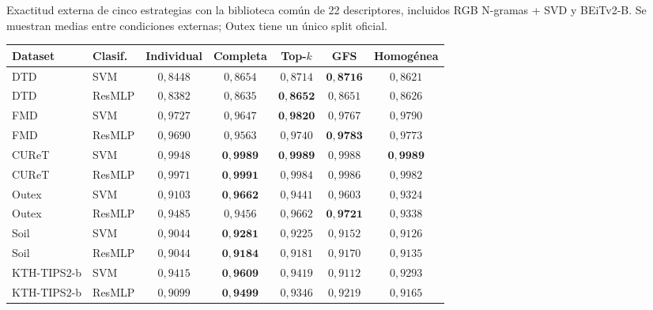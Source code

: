\begin{resulttable}
\centering\fontsize{8}{10}\selectfont\setlength{\tabcolsep}{3.0pt}
\caption{Exactitud externa de cinco estrategias con la biblioteca común de 22 descriptores, incluidos RGB N-gramas + SVD y BEiTv2-B. Se muestran medias entre condiciones externas; Outex tiene un único split oficial.}
\label{tab:accuracy}
\begin{tabular}{@{}llccccc@{}}
\toprule
Dataset & Clasif. & Individual & Completa & Top-$k$ & GFS & Homogénea \\
\midrule
DTD & SVM & $0{,}8448$ & $0{,}8654$ & $0{,}8714$ & $\mathbf{0{,}8716}$ & $0{,}8621$ \\
DTD & ResMLP & $0{,}8382$ & $0{,}8635$ & $\mathbf{0{,}8652}$ & $0{,}8651$ & $0{,}8626$ \\
FMD & SVM & $0{,}9727$ & $0{,}9647$ & $\mathbf{0{,}9820}$ & $0{,}9767$ & $0{,}9790$ \\
FMD & ResMLP & $0{,}9690$ & $0{,}9563$ & $0{,}9740$ & $\mathbf{0{,}9783}$ & $0{,}9773$ \\
CUReT & SVM & $0{,}9948$ & $\mathbf{0{,}9989}$ & $\mathbf{0{,}9989}$ & $0{,}9988$ & $\mathbf{0{,}9989}$ \\
CUReT & ResMLP & $0{,}9971$ & $\mathbf{0{,}9991}$ & $0{,}9984$ & $0{,}9986$ & $0{,}9982$ \\
Outex & SVM & $0{,}9103$ & $\mathbf{0{,}9662}$ & $0{,}9441$ & $0{,}9603$ & $0{,}9324$ \\
Outex & ResMLP & $0{,}9485$ & $0{,}9456$ & $0{,}9662$ & $\mathbf{0{,}9721}$ & $0{,}9338$ \\
Soil & SVM & $0{,}9044$ & $\mathbf{0{,}9281}$ & $0{,}9225$ & $0{,}9152$ & $0{,}9126$ \\
Soil & ResMLP & $0{,}9044$ & $\mathbf{0{,}9184}$ & $0{,}9181$ & $0{,}9170$ & $0{,}9135$ \\
KTH-TIPS2-b & SVM & $0{,}9415$ & $\mathbf{0{,}9609}$ & $0{,}9419$ & $0{,}9112$ & $0{,}9293$ \\
KTH-TIPS2-b & ResMLP & $0{,}9099$ & $\mathbf{0{,}9499}$ & $0{,}9346$ & $0{,}9219$ & $0{,}9165$ \\
\bottomrule
\end{tabular}
\end{resulttable}
\FloatBarrier

